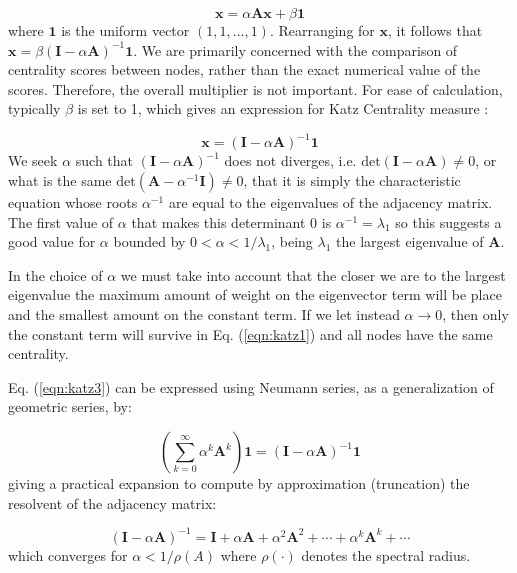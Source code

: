 \begin{equation}
\label{eqn:katz2}
    \mathbf{x}= \alpha\mathbf{Ax} + \beta\mathbf{1}
\end{equation}
where $\mathbf{1}$ is the uniform vector $(1,1,\dots,1)$. Rearranging for $\mathbf{x}$, it follows that $\mathbf{x} = \beta (\mathbf{I}-\alpha\mathbf{A})^{-1}\mathbf{1}$.
We are primarily concerned with the comparison of centrality scores between nodes, rather than the exact numerical value of the scores. Therefore, the overall multiplier is not important. For ease of calculation, typically $\beta$ is set to 1, which gives an expression for Katz Centrality measure \cite{katz1953new}:

\begin{equation}
\label{eqn:katz3}
    \mathbf{x} = (\mathbf{I}-\alpha\mathbf{A})^{-1}\mathbf{1}
\end{equation}
We seek $\alpha$ such that $(\mathbf{I}-\alpha\mathbf{A})^{-1}$ does not diverges, i.e. $\text{det}(\mathbf{I}-\alpha\mathbf{A})\neq 0$, or what is the same $\text{det}(\mathbf{A}-\alpha^{-1}\mathbf{I})\neq 0$, that it is simply the characteristic equation whose roots $\alpha^{-1}$ are equal to the eigenvalues of the adjacency matrix. The first value of $\alpha$ that makes this determinant $0$ is $\alpha^{-1}=\lambda_1$ so this suggests a good value for $\alpha$ bounded by $0 < \alpha < 1/\lambda_1 $, being $\lambda_1$ the largest eigenvalue of $\mathbf{A}$. 

In the choice of $\alpha$ we must take into account that the closer we are to the largest eigenvalue the maximum amount of weight on the eigenvector term will be place and the smallest amount on the constant term. If we let instead $\alpha\to 0$, then only the constant term will survive in Eq. (\ref{eqn:katz1}) and all nodes have the same centrality.

Eq. (\ref{eqn:katz3}) can be expressed using Neumann series, as a generalization of geometric series, by: 

\begin{equation}
\label{eqn:katz4}
    \left(\sum_{k=0}^{\infty}\alpha^k \mathbf{A}^k\right)\mathbf{1} = (\mathbf{I}-\alpha\mathbf{A})^{-1}\mathbf{1}
\end{equation}
giving a practical expansion to compute by approximation (truncation) the resolvent of the adjacency matrix:

\begin{equation}
\label{eqn:katz5}
    (\mathbf{I}-\alpha\mathbf{A})^{-1} = \mathbf{I} + \alpha\mathbf{A} + \alpha^2\mathbf{A}^2 + \cdots + \alpha^k\mathbf{A}^k + \cdots
\end{equation}
which converges for $\alpha<1/\rho(A)$ where $\rho(\cdot)$ denotes the spectral radius. 


